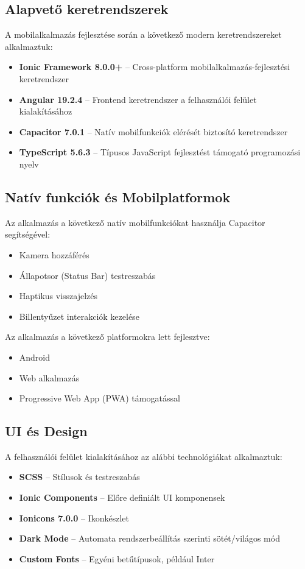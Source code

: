 \documentclass[12pt]{report}
\begin{document}
\subsection{Alapvető keretrendszerek}
A mobilalkalmazás fejlesztése során a következő modern keretrendszereket alkalmaztuk:
\begin{itemize}
    \item \textbf{Ionic Framework 8.0.0+} -- Cross-platform mobilalkalmazás-fejlesztési keretrendszer
    \item \textbf{Angular 19.2.4} -- Frontend keretrendszer a felhasználói felület kialakításához
    \item \textbf{Capacitor 7.0.1} -- Natív mobilfunkciók elérését biztosító keretrendszer
    \item \textbf{TypeScript 5.6.3} -- Típusos JavaScript fejlesztést támogató programozási nyelv
\end{itemize}

\subsection{Natív funkciók és Mobilplatformok}
Az alkalmazás a következő natív mobilfunkciókat használja Capacitor segítségével:
\begin{itemize}
    \item Kamera hozzáférés
    \item Állapotsor (Status Bar) testreszabás
    \item Haptikus visszajelzés
    \item Billentyűzet interakciók kezelése
\end{itemize}

Az alkalmazás a következő platformokra lett fejlesztve:
\begin{itemize}
    \item Android
    \item Web alkalmazás
    \item Progressive Web App (PWA) támogatással
\end{itemize}

\subsection{UI és Design}
A felhasználói felület kialakításához az alábbi technológiákat alkalmaztuk:
\begin{itemize}
    \item \textbf{SCSS} -- Stílusok és testreszabás
    \item \textbf{Ionic Components} -- Előre definiált UI komponensek
    \item \textbf{Ionicons 7.0.0} -- Ikonkészlet
    \item \textbf{Dark Mode} -- Automata rendszerbeállítás szerinti sötét/világos mód
    \item \textbf{Custom Fonts} -- Egyéni betűtípusok, például Inter
\end{itemize}
\end{document}
